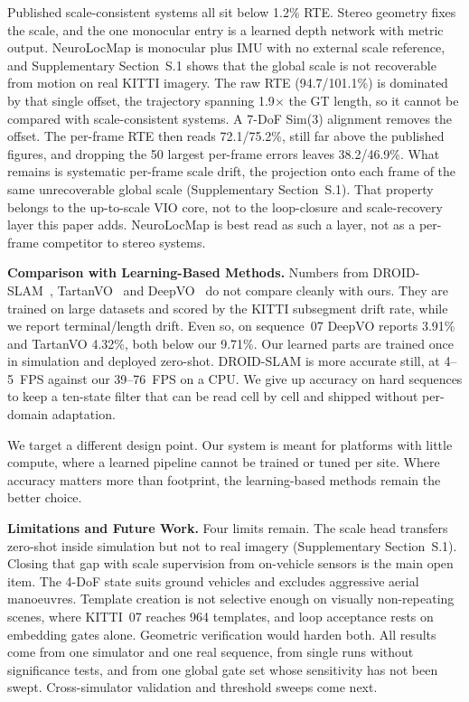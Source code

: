 Published scale-consistent systems all sit below 1.2\% RTE. Stereo geometry fixes the scale, and the one monocular entry is a learned depth network with metric output. NeuroLocMap is monocular plus IMU with no external scale reference, and Supplementary Section~S.1 shows that the global scale is not recoverable from motion on real KITTI imagery. The raw RTE (94.7/101.1\%) is dominated by that single offset, the trajectory spanning 1.9$\times$ the GT length, so it cannot be compared with scale-consistent systems. A 7-DoF Sim(3) alignment removes the offset. The per-frame RTE then reads 72.1/75.2\%, still far above the published figures, and dropping the 50 largest per-frame errors leaves 38.2/46.9\%. What remains is systematic per-frame scale drift, the projection onto each frame of the same unrecoverable global scale (Supplementary Section~S.1). That property belongs to the up-to-scale VIO core, not to the loop-closure and scale-recovery layer this paper adds. NeuroLocMap is best read as such a layer, not as a per-frame competitor to stereo systems.

\textbf{Comparison with Learning-Based Methods.} Numbers from DROID-SLAM~\cite{teed2021droid}, TartanVO~\cite{wang2021tartanvo} and DeepVO~\cite{wang2017deepvo} do not compare cleanly with ours. They are trained on large datasets and scored by the KITTI subsegment drift rate, while we report terminal/length drift. Even so, on sequence~07 DeepVO reports 3.91\% and TartanVO 4.32\%, both below our 9.71\%. Our learned parts are trained once in simulation and deployed zero-shot. DROID-SLAM is more accurate still, at 4--5~FPS against our 39--76~FPS on a CPU. We give up accuracy on hard sequences to keep a ten-state filter that can be read cell by cell and shipped without per-domain adaptation.

We target a different design point. Our system is meant for platforms with little compute, where a learned pipeline cannot be trained or tuned per site. Where accuracy matters more than footprint, the learning-based methods remain the better choice.

\textbf{Limitations and Future Work.} Four limits remain. The scale head transfers zero-shot inside simulation but not to real imagery (Supplementary Section~S.1). Closing that gap with scale supervision from on-vehicle sensors is the main open item. The 4-DoF state suits ground vehicles and excludes aggressive aerial manoeuvres. Template creation is not selective enough on visually non-repeating scenes, where KITTI~07 reaches 964 templates, and loop acceptance rests on embedding gates alone. Geometric verification would harden both. All results come from one simulator and one real sequence, from single runs without significance tests, and from one global gate set whose sensitivity has not been swept. Cross-simulator validation and threshold sweeps come next.
